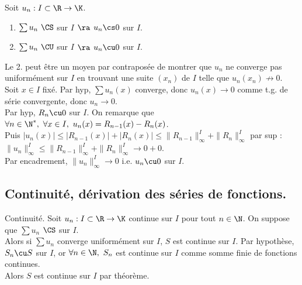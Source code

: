 \documentclass[11pt]{article}
\begin{document}
\begin{prop}{}{}
    Soit $u_n:I\subset\R\to\K$.
    \begin{enumerate}
        \item $\sum u_n ~ \CS$ sur $I$ $\ra$ $u_n\cs0$ sur $I$.
        \item $\sum u_n ~ \CU$ sur $I$ $\ra$ $u_n\cu0$ sur $I$. 
    \end{enumerate}
    Le 2. peut être un moyen par contraposée de montrer que $u_n$ ne converge pas uniformément sur $I$ en trouvant une suite $(x_n)$ de $I$ telle que $u_n(x_n)\not\to0$.
    \tcblower
     Soit $x\in I$ fixé. Par hyp, $\sum u_n(x)$ converge, donc $u_n(x)\to0$ comme t.g. de série convergente, donc $u_n\to0$.\\
     Par hyp, $R_n\cu0$ sur $I$. On remarque que $\forall n \in \N^*, ~ \forall x \in I, ~ u_n(x)=R_{n-1}(x)-R_n(x)$.\\
    Puis $|u_n(x)|\leq|R_{n-1}(x)|+|R_n(x)|\leq\|R_{n-1}\|_\infty^I+\|R_n\|_\infty^I$ par sup : $\|u_n\|_\infty^I\leq\|R_{n-1}\|_\infty^I+\|R_n\|_\infty^I \to 0 + 0$.\\
    Par encadrement, $\|u_n\|_\infty^I\to0$ i.e. $u_n\cu0$ sur $I$.
\end{prop}

\vspace*{-0.8cm}

\subsection{Continuité, dérivation des séries de fonctions.}

\begin{thm}{Continuité.}{}
    Soit $u_n:I\subset\R\to\K$ continue sur $I$ pour tout $n\in\N$. On suppose que $\sum u_n$ $\CS$ sur $I$.\\
    Alors si $\sum u_n$ converge uniformément sur $I$, $S$ est continue sur $I$.
    \tcblower
    Par hypothèse, $S_n\cu S$ sur $I$, or $\forall n \in \N, ~ S_n$ est continue sur $I$ comme somme finie de fonctions continues.\\
    Alors $S$ est continue sur $I$ par théorème.
\end{thm}

\vspace*{-0.8cm}
\end{document}
